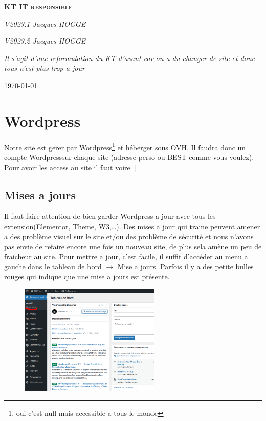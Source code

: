 \documentclass[12pt]{article}
\begin{document}
\begin{titlepage}
	\centering
	
	
	\vspace{0.5cm}
	{\Large \scshape\bfseries KT IT responsible}
	\vspace{0.5cm}

	{ \Huge }
	

	{\itshape V2023.1 \large  Jacques HOGGE \par}
	{\itshape V2023.2 \large  Jacques HOGGE \par}

	\vspace{5cm}
	
	
	\textit{Il s'agit d'une reformulation du KT d'avant car on a du changer de site et donc tous n'est plus trop a jour}
	

	\vfill
	
    {\Large  \today}
\end{titlepage}
\newpage

\section{Wordpress}\label{Wordpress}
	Notre site est gerer par Wordpress\footnote{oui c'est null mais accessible a tous le monde} et héberger sous OVH. Il faudra donc un compte Wordpresssur chaque site (adresse perso ou BEST comme vous voulez). Pour avoir les access au site il faut voire \autoref{}
	
	\subsection{Mises a jours}
		Il faut faire attention de bien garder Wordpress a jour avec tous les extension(Elementor, Theme, W3,\dots). Des mises a jour qui traine peuvent amener a des problème visuel sur le site et/ou des problème de sécurité et nous n'avons pas envie de refaire encore une fois un nouveau site, de plus sela amène un peu de fraicheur au site. Pour mettre a jour, c'est facile, il suffit d'accéder au menu a gauche dans le tableau de bord $\rightarrow$ Mise a jours. Parfois il y a des petite bulles rouges qui indique que une mise a jours est présente.
		\begin{figure}[htp]
			\centering
			\includegraphics[width=0.6\textwidth]{img/MiseAJours.png}
		\end{figure}
		
\end{document}
